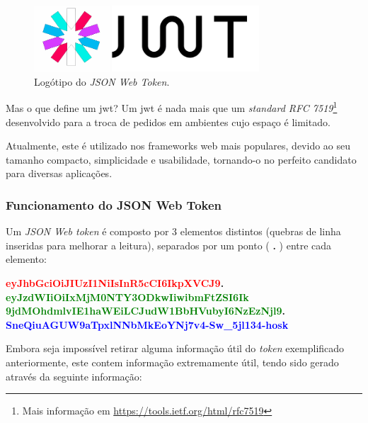 \begin{figure}[h]
    \centering
    \includegraphics[width=0.75\textwidth]{img/jwt/jwtlogo.png}
    \caption{Logótipo do \emph{JSON Web Token}. \cite{jwtLogo}}
\end{figure}

Mas o que define um \gls{jwt}? Um \gls{jwt} é nada mais que um \emph{standard RFC 7519}\footnote{Mais informação em \url{https://tools.ietf.org/html/rfc7519}} desenvolvido para a troca de pedidos em ambientes cujo espaço é limitado. 

Atualmente, este é utilizado nos frameworks web mais populares, devido ao seu tamanho compacto, simplicidade e usabilidade, tornando-o no perfeito candidato para diversas aplicações.

\cleardoublepage
\subsubsection{Funcionamento do JSON Web Token}

Um \emph{JSON Web token} é composto por 3 elementos distintos (quebras de linha inseridas para melhorar a leitura), separados por um ponto (\textbf{ . }) entre cada elemento:

\begin{center}
    \textbf{\textcolor{red}{eyJhbGciOiJIUzI1NiIsInR5cCI6IkpXVCJ9}.\\
    \textcolor{green}{eyJzdWIiOiIxMjM0NTY3ODkwIiwibmFtZSI6Ik\\9jdMOhdmlvIE1haWEiLCJudW1BbHVubyI6NzEzNjl9}.\\
    \textcolor{blue}{SneQiuAGUW9aTpxlNNbMkEoYNj7v4-Sw\_5jl134-hosk}}
\end{center}

Embora seja impossível retirar alguma informação útil do \emph{token} exemplificado anteriormente, este contem informação extremamente útil, tendo sido gerado através da seguinte informação:

